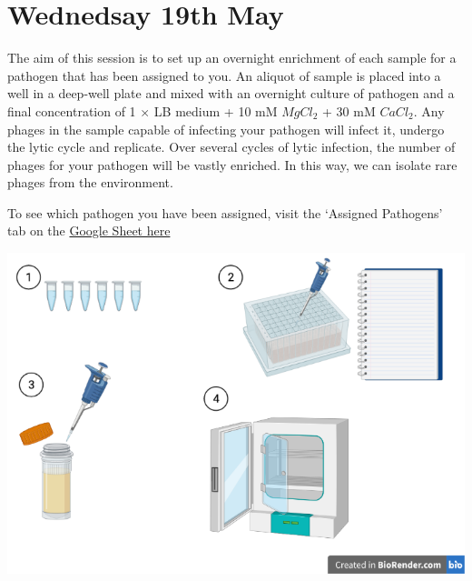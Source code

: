 \documentclass[
]{book}
\begin{document}
\hypertarget{wednedsay-19th-may}{%
\section{Wednedsay 19th May}\label{wednedsay-19th-may}}

The aim of this session is to set up an overnight enrichment of each sample for a pathogen that has been assigned to you. An aliquot of sample is placed into a well in a deep-well plate and mixed with an overnight culture of pathogen and a final concentration of 1 \(\times\) LB medium + 10 mM \(MgCl_{2}\) + 30 mM \(CaCl_{2}\). Any phages in the sample capable of infecting your pathogen will infect it, undergo the lytic cycle and replicate. Over several cycles of lytic infection, the number of phages for your pathogen will be vastly enriched. In this way, we can isolate rare phages from the environment.

To see which pathogen you have been assigned, visit the `Assigned Pathogens' tab on the \href{https://docs.google.com/spreadsheets/d/1V6doztAX4AQ5657eH5r0GbJj_GnfMxTe4eKh7metXl0/edit?usp=sharing}{Google Sheet here}

\includegraphics{images/enrichment-1.png}
\end{document}
